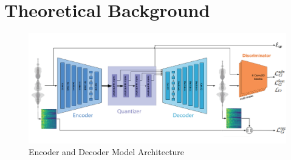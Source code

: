 \documentclass[12pt]{report}
\begin{document}
\chapter{Theoretical Background}

\begin{figure}[H]
\includegraphics[width=1\textwidth]{Images/encoderdecoder.pdf}
\caption{Encoder and Decoder Model Architecture}
\end{figure}
\end{document}
